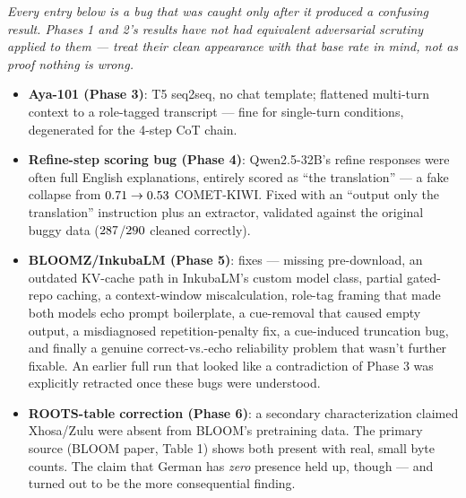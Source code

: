 \documentclass[11pt]{article}
\begin{document}
\noindent\footnotesize\textit{Every entry below is a bug that was caught only after it produced
a confusing result. Phases 1 and 2's results have not had equivalent adversarial scrutiny applied
to them --- treat their clean appearance with that base rate in mind, not as proof nothing is
wrong.}\normalsize

\begin{itemize}
  \item \textbf{Aya-101 (Phase 3)}: T5 seq2seq, no chat template; flattened multi-turn context
    to a role-tagged transcript --- fine for single-turn conditions, degenerated for the 4-step
    CoT chain.
  \item \textbf{Refine-step scoring bug (Phase 4)}: Qwen2.5-32B's refine responses were often
    full English explanations, entirely scored as ``the translation'' --- a fake collapse from
    $0.71{} \to 0.53$
    COMET-KIWI. Fixed with an ``output only the translation'' instruction plus an extractor,
    validated against the original buggy data
    ($287$/$290$ cleaned correctly).
  \item \textbf{BLOOMZ/InkubaLM (Phase 5)}: \PhaseFiveNBugsFixedBloomzInkubalm{} fixes --- missing
    pre-download, an outdated KV-cache path in InkubaLM's custom model class, partial
    gated-repo caching, a context-window miscalculation, role-tag framing that made both models
    echo prompt boilerplate, a cue-removal that caused empty output, a misdiagnosed
    repetition-penalty fix, a cue-induced truncation bug, and finally a genuine
    correct-vs.-echo reliability problem that wasn't further fixable. An earlier full run that
    looked like a contradiction of Phase 3 was explicitly retracted once these bugs were
    understood.
  \item \textbf{ROOTS-table correction (Phase 6)}: a secondary characterization claimed
    Xhosa/Zulu were absent from BLOOM's pretraining data. The primary source (BLOOM paper,
    Table 1) shows both present with real, small byte counts. The claim that German has
    \emph{zero} presence held up, though --- and turned out to be the more consequential
    finding.
\end{itemize}
\end{document}
